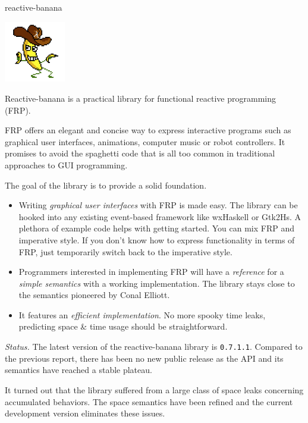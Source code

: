 \begin{hcarentry}[updated]{reactive-banana}
\makeheader

\begin{center}
\includegraphics[width=0.2\textwidth]{html/banana.jpg}
\end{center}

Reactive-banana is a practical library for functional reactive programming (FRP).

FRP offers an elegant and concise way to express interactive programs such as graphical user interfaces, animations, computer music or robot controllers. It promises to avoid the spaghetti code that is all too common in traditional approaches to GUI programming.

The goal of the library is to provide a solid foundation.
\begin{itemize}
\item Writing \emph{graphical user interfaces} with FRP is made easy. The library can be hooked into any existing event-based framework like wxHaskell or Gtk2Hs. A plethora of example code helps with getting started. You can mix FRP and imperative style. If you don't know how to express functionality in terms of FRP, just temporarily switch back to the imperative style.
\item Programmers interested in implementing FRP will have a \emph{reference} for a \emph{simple semantics} with a working implementation. The library stays close to the semantics pioneered by Conal Elliott.
\item It features an \emph{efficient implementation}. No more spooky time leaks, predicting space \& time usage should be straightforward.
\end{itemize}

\emph{Status.} The latest version of the reactive-banana library is \verb!0.7.1.1!. Compared to the previous report, there has been no new public release as the API and its semantics have reached a stable plateau.

It turned out that the library suffered from a large class of space leaks concerning accumulated behaviors. The space semantics have been refined and the current development version eliminates these issues.


\end{hcarentry}
